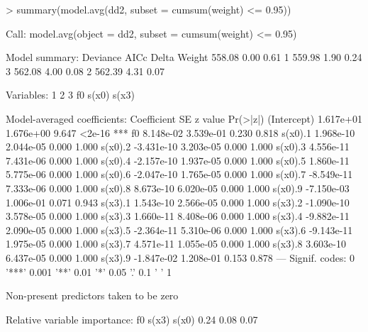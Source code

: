 \documentclass{article}
\begin{document}
\begin{Schunk}
\begin{Sinput}
> summary(model.avg(dd2, subset = cumsum(weight) <= 0.95))
\end{Sinput}
\begin{Soutput}
Call:  model.avg(object = dd2, subset = cumsum(weight) <= 0.95)


Model summary:
  Deviance   AICc Delta Weight
           558.08  0.00   0.61
1          559.98  1.90   0.24
3          562.08  4.00   0.08
2          562.39  4.31   0.07

Variables:
    1     2     3 
   f0 s(x0) s(x3) 

Model-averaged coefficients:
            Coefficient         SE z value Pr(>|z|)    
(Intercept)   1.617e+01  1.676e+00   9.647   <2e-16 ***
f0            8.148e-02  3.539e-01   0.230    0.818    
s(x0).1       1.968e-10  2.044e-05   0.000    1.000    
s(x0).2      -3.431e-10  3.203e-05   0.000    1.000    
s(x0).3       4.556e-11  7.431e-06   0.000    1.000    
s(x0).4      -2.157e-10  1.937e-05   0.000    1.000    
s(x0).5       1.860e-11  5.775e-06   0.000    1.000    
s(x0).6      -2.047e-10  1.765e-05   0.000    1.000    
s(x0).7      -8.549e-11  7.333e-06   0.000    1.000    
s(x0).8       8.673e-10  6.020e-05   0.000    1.000    
s(x0).9      -7.150e-03  1.006e-01   0.071    0.943    
s(x3).1       1.543e-10  2.566e-05   0.000    1.000    
s(x3).2      -1.090e-10  3.578e-05   0.000    1.000    
s(x3).3       1.660e-11  8.408e-06   0.000    1.000    
s(x3).4      -9.882e-11  2.090e-05   0.000    1.000    
s(x3).5      -2.364e-11  5.310e-06   0.000    1.000    
s(x3).6      -9.143e-11  1.975e-05   0.000    1.000    
s(x3).7       4.571e-11  1.055e-05   0.000    1.000    
s(x3).8       3.603e-10  6.437e-05   0.000    1.000    
s(x3).9      -1.847e-02  1.208e-01   0.153    0.878    
---
Signif. codes:  0 '***' 0.001 '**' 0.01 '*' 0.05 '.' 0.1 ' ' 1 

Non-present predictors taken to be zero 

Relative variable importance:
   f0 s(x3) s(x0) 
 0.24  0.08  0.07 
\end{Soutput}
\end{Schunk}
\end{document}
